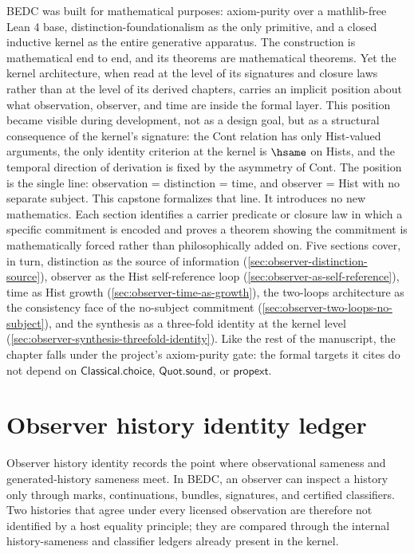 BEDC was built for mathematical purposes: axiom-purity over a mathlib-free Lean 4 base, distinction-foundationalism as the only primitive, and a closed inductive kernel as the entire generative apparatus. The construction is mathematical end to end, and its theorems are mathematical theorems. Yet the kernel architecture, when read at the level of its signatures and closure laws rather than at the level of its derived chapters, carries an implicit position about what observation, observer, and time are inside the formal layer. This position became visible during development, not as a design goal, but as a structural consequence of the kernel's signature: the Cont relation has only Hist-valued arguments, the only identity criterion at the kernel is \(\hsame\) on Hists, and the temporal direction of derivation is fixed by the asymmetry of Cont. The position is the single line: observation = distinction = time, and observer = Hist with no separate subject. This capstone formalizes that line. It introduces no new mathematics. Each section identifies a carrier predicate or closure law in which a specific commitment is encoded and proves a theorem showing the commitment is mathematically forced rather than philosophically added on. Five sections cover, in turn, distinction as the source of information (\autoref{sec:observer-distinction-source}), observer as the Hist self-reference loop (\autoref{sec:observer-as-self-reference}), time as Hist growth (\autoref{sec:observer-time-as-growth}), the two-loops architecture as the consistency face of the no-subject commitment (\autoref{sec:observer-two-loops-no-subject}), and the synthesis as a three-fold identity at the kernel level (\autoref{sec:observer-synthesis-threefold-identity}). Like the rest of the manuscript, the chapter falls under the project's axiom-purity gate: the formal targets it cites do not depend on \(\mathsf{Classical.choice}\), \(\mathsf{Quot.sound}\), or \(\mathsf{propext}\).

\section{Observer history identity ledger}
\label{sec:observer-history-identity-ledger}

Observer history identity records the point where observational sameness and generated-history sameness meet. In BEDC, an observer can inspect a history only through marks, continuations, bundles, signatures, and certified classifiers. Two histories that agree under every licensed observation are therefore not identified by a host equality principle; they are compared through the internal history-sameness and classifier ledgers already present in the kernel.

